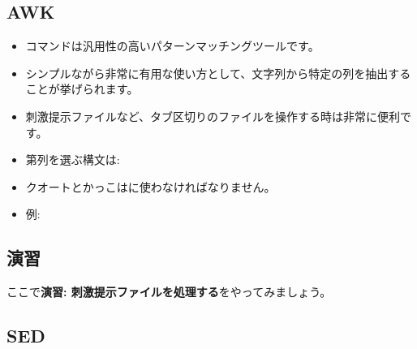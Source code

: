\documentclass{jsarticle}
\begin{document}
\subsection{AWK}


\begin{itemize}
\item {\color{red}}コマンドは汎用性の高いパターンマッチングツールです。
\item シンプルながら非常に有用な使い方として、文字列から特定の列を抽出することが挙げられます。
\item 刺激提示ファイルなど、タブ区切りのファイルを操作する時は非常に便利です。

\bigskip

\item 第{\color{red}{\em N}}列を選ぶ構文は:

{\color{red}}

\bigskip

\item クオートとかっこは{\color{red}{\bf 示された通り}}に使わなければなりません。
\item 例:

{}

\end{itemize}




\subsection*{演習}

ここで{\bf 演習: 刺激提示ファイルを処理する}をやってみましょう。


\subsection{SED}
\end{document}
